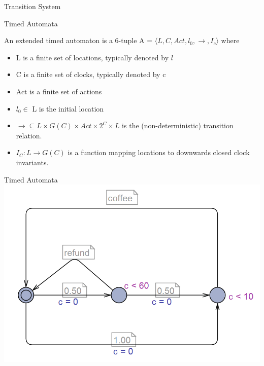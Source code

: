 \begin{frame}{Transition System}
\begin{figure}
\end{figure}
\end{frame}


\begin{frame}{Timed Automata}
\begin{mydef}
\label{def:TA}
An extended timed automaton is a 6-tuple A = $\langle L, C, Act, l_0, \rightarrow, I_c\rangle$ where
	\begin{itemize}
		\item L is a finite set of locations, typically denoted by $l$
		\item C is a finite set of clocks, typically denoted by c
		\item Act is a finite set of actions
		\item $l_0 \in$ L is the initial location
		\item $\rightarrow \subseteq L \times G(C) \times Act \times 2^C \times L$ is the (non-deterministic) transition relation.
		\item $I_C : L \rightarrow G(C)$ is a function mapping locations to downwards closed clock invariants.
	\end{itemize}
\end{mydef}
\end{frame}

\begin{frame}{Timed Automata}
\includegraphics[width=\textwidth]{img/TA}
\end{frame}


